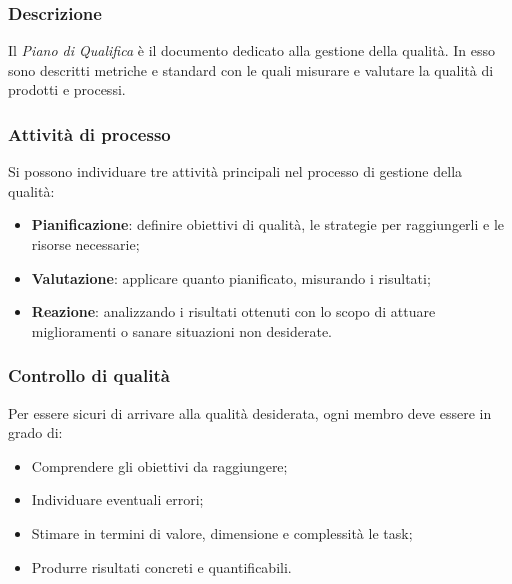 \subsubsection{Descrizione}
Il \textit{Piano di Qualifica} è il documento dedicato alla gestione della qualità. In esso sono descritti metriche e standard con le quali misurare e valutare la qualità di prodotti e processi.  

\subsubsection{Attività di processo}
Si possono individuare tre attività principali nel processo di gestione della qualità:
\begin{itemize}
\item \textbf{Pianificazione}: definire obiettivi di qualità, le strategie per raggiungerli e le risorse necessarie; 
\item \textbf{Valutazione}: applicare quanto pianificato, misurando i risultati;
\item \textbf{Reazione}: analizzando i risultati ottenuti con lo scopo di attuare miglioramenti o sanare situazioni non desiderate.
\end{itemize}

\subsubsection{Controllo di qualità}
Per essere sicuri di arrivare alla qualità desiderata, ogni membro deve essere in grado di:
\begin{itemize}
\item Comprendere gli obiettivi da raggiungere;
\item Individuare eventuali errori;
\item Stimare in termini di valore, dimensione e complessità le task;
\item Produrre risultati concreti e quantificabili.
\end{itemize}

